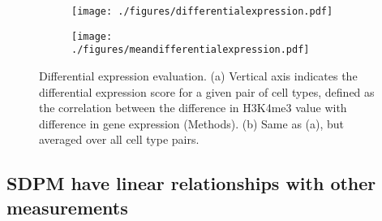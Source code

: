 \documentclass[11pt]{article}
\begin{document}


\begin{figure}[th!]
	\begin{subfigure}[b]{1\textwidth}
		\texttt{[image: ./figures/differentialexpression.pdf]}
		\caption{}
		\label{fig:binpearson}
		\hfill
	\end{subfigure}
	\begin{subfigure}[b]{0.75\textwidth}
		\texttt{[image: ./figures/meandifferentialexpression.pdf]}
		\caption{}
		\label{fig:bandpearson}
	\end{subfigure}
	
	\caption{Differential expression evaluation. (a) Vertical axis indicates the differential expression score for a given pair of cell types, defined as the correlation between the difference in H3K4me3 value with difference in gene expression (Methods). (b) Same as (a), but averaged over all cell type pairs.}
	\label{fig:meanvarrelation}
\end{figure}

\subsection{SDPM have linear relationships with other measurements}
\end{document}
